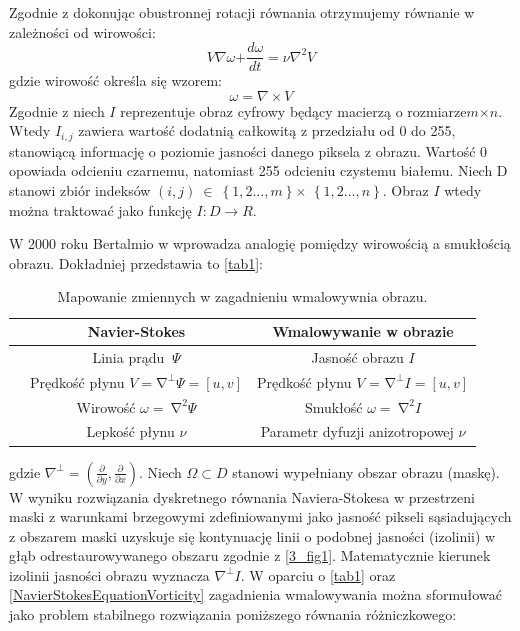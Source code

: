 \documentclass[12pt, twoside, openany]{report}
\theoremstyle{definition}
\begin{document}
Zgodnie z \cite{StreamfuntionVorticityForm} dokonując obustronnej rotacji równania otrzymujemy równanie w zależności od wirowości:
\begin{equation}
V\nabla \omega \mathrm{+}\frac{d\omega }{dt}\mathrm{=}\nu {\nabla }^{\mathrm{2}}V
\label{NavierStokesEquationVorticity}
\end{equation}
gdzie wirowość określa się wzorem:
\begin{equation}
\omega =\nabla \times V
\label{Vorticity}
\end{equation}
Zgodnie z \cite{ebrahimi2012navier} niech $I$ reprezentuje obraz cyfrowy będący macierzą o rozmiarze$m \mathrm{\times} n$. Wtedy $I_{i,j}$ zawiera wartość dodatnią całkowitą z przedziału od 0 do 255, stanowiącą informację o poziomie jasności danego piksela z obrazu. Wartość 0 opowiada odcieniu czarnemu, natomiast 255 odcieniu czystemu białemu. Niech D stanowi zbiór indeksów $(i,j)\ \in \ \left\{1,2\dots ,m\right\} \mathrm{\times}$ $\left\{1,2\dots ,n\right\}$. Obraz $I$ wtedy można traktować jako funkcję $I:D\to R$.
\par
W 2000 roku Bertalmio w \cite{BertalmioNavierStokes} wprowadza analogię pomiędzy wirowością a smukłością obrazu. Dokładniej przedstawia to \autoref{tab1}:
\begin{table}[!h]
	\centering
	\begin{tabular}{|cc|c|}
	\hline \hline

		& Navier-Stokes
		& Wmalowywanie w obrazie\\ \hline
		
		& Linia prądu $\ \mathit{\Psi}$ &  Jasność obrazu $I$ \\ \hline
	
		& Prędkość płynu $V = {\mathrm{\nabla }}^{\bot }\mathit{\Psi} = [u, v]$  & Prędkość płynu $V$ = ${\mathrm{\nabla }}^{\bot }I = [u, v]$ \\ \hline
		& Wirowość $\omega =\ {\mathrm{\nabla }}^2\mathit{\Psi}$ & Smukłość $\omega =\ {\mathrm{\nabla }}^2I$ \\ \hline
		
		& Lepkość płynu $\nu $ & Parametr dyfuzji anizotropowej $\nu $ \\
	\hline
	\end{tabular}
	\caption{Mapowanie zmiennych w zagadnieniu wmalowywnia obrazu.}
	\label{tab1}
\end{table}
gdzie ${\nabla }^{\bot }=(\frac{\partial }{\partial y},\frac{\partial }{\partial x})$.
Niech $\mathit{\Omega}\subset D$ stanowi wypełniany obszar obrazu (maskę). W wyniku rozwiązania dyskretnego równania Naviera-Stokesa w przestrzeni maski z warunkami brzegowymi zdefiniowanymi jako jasność pikseli sąsiadujących z obszarem maski uzyskuje się kontynuację linii o podobnej jasności (izolinii) w głąb odrestaurowywanego obszaru zgodnie z \autoref{3_fig1}.  Matematycznie kierunek izolinii jasności obrazu wyznacza ${\nabla }^{\bot }I$. W oparciu o \autoref{tab1} oraz \eqref{NavierStokesEquationVorticity} zagadnienia wmalowywania można sformułować jako problem stabilnego rozwiązania poniższego równania różniczkowego:
\end{document}
